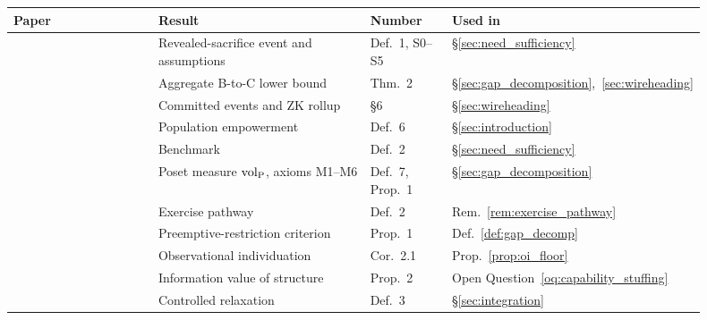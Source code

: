 \begin{center}
\small
\begin{tabular}{@{}>{\raggedright\arraybackslash}p{0.22\linewidth}
                  >{\raggedright\arraybackslash}p{0.32\linewidth}
                  >{\raggedright\arraybackslash}p{0.12\linewidth}
                  >{\raggedright\arraybackslash}p{0.24\linewidth}@{}}
\toprule
\textbf{Paper} & \textbf{Result} & \textbf{Number}
  & \textbf{Used in} \\
\midrule
\citep[Revealed~Sacrifice]{lasser2026paper8a}
  & Revealed-sacrifice event and assumptions & Def.~1, S0--S5
  & \S\ref{sec:need_sufficiency} \\
\citep[Revealed~Sacrifice]{lasser2026paper8a}
  & Aggregate B-to-C lower bound & Thm.~2
  & \S\ref{sec:gap_decomposition},~\ref{sec:wireheading} \\
\citep[Revealed~Sacrifice]{lasser2026paper8a}
  & Committed events and ZK rollup & \S6
  & \S\ref{sec:wireheading} \\
\citep[Foundation]{lasser2026gfm}
  & Population empowerment & Def.~6
  & \S\ref{sec:introduction} \\
\citep[Poset~Definition]{lasser2026poset}
  & Benchmark & Def.~2
  & \S\ref{sec:need_sufficiency} \\
\citep[Poset~Definition]{lasser2026poset}
  & Poset measure ${\operatorname{vol}_{\mathrm{P}}}$, axioms M1--M6 & Def.~7, Prop.~1
  & \S\ref{sec:gap_decomposition} \\
\citep[Horizon~Aware]{lasser2026horizon}
  & Exercise pathway & Def.~2
  & Rem.~\ref{rem:exercise_pathway} \\
\citep[Horizon~Aware]{lasser2026horizon}
  & Preemptive-restriction criterion & Prop.~1
  & Def.~\ref{def:gap_decomp} \\
\citep[Horizon~Aware]{lasser2026horizon}
  & Observational individuation & Cor.~2.1
  & Prop.~\ref{prop:oi_floor} \\
\citep[Horizon~Aware]{lasser2026horizon}
  & Information value of structure & Prop.~2
  & Open Question~\ref{oq:capability_stuffing} \\
\citep[Controlled~Relaxation]{lasser2026wamura}
  & Controlled relaxation & Def.~3
  & \S\ref{sec:integration} \\
\bottomrule
\end{tabular}
\end{center}
